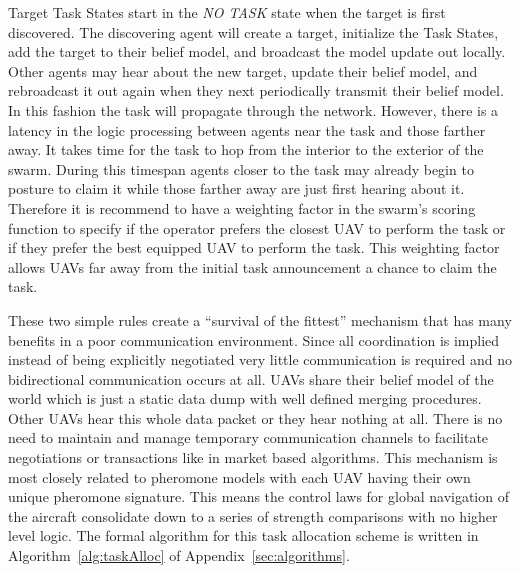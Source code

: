 Target Task States start in the \textit{NO TASK} state when the target is first discovered.  The discovering agent will create a target, initialize the Task States,  add the target to their belief model, and broadcast the model update out locally.  Other agents may hear about the new target, update their belief model, and rebroadcast it out again when they next periodically transmit their belief model.  In this fashion the task will propagate through the network.  However, there is a latency in the logic processing between agents near the task and those farther away.  It takes time for the task to hop from the interior to the exterior of the swarm.  During this timespan agents closer to the task may already begin to posture to claim it while those farther away are just first hearing about it.  Therefore it is recommend to have a weighting factor in the swarm's scoring function to specify if the operator prefers the closest UAV to perform the task or if they prefer the best equipped UAV to perform the task.  This weighting factor allows UAVs far away from the initial task announcement a chance to claim the task.

These two simple rules create a ``survival of the fittest'' mechanism that has many benefits in a poor communication environment.  Since all coordination is implied instead of being explicitly negotiated very little communication is required and no bidirectional communication occurs at all.  UAVs share their belief model of the world which is just a static data dump with well defined merging procedures.  Other UAVs hear this whole data packet or they hear nothing at all.  There is no need to maintain and manage temporary communication channels to facilitate negotiations or transactions like in market based algorithms.  This mechanism is most closely related to pheromone models with each UAV having their own unique pheromone signature.  This means the control laws for global navigation of the aircraft consolidate down to a series of strength comparisons with no higher level logic.  The formal algorithm for this task allocation scheme is written in Algorithm~\ref{alg:taskAlloc} of Appendix~\ref{sec:algorithms}.

